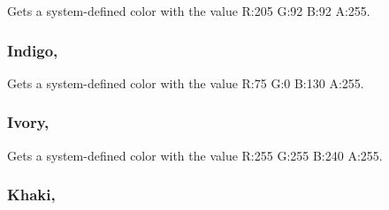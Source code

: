Gets a system-\/defined color with the value R\+:205 G\+:92 B\+:92 A\+:255.

\hypertarget{structMicrosoft_1_1Xna_1_1Framework_1_1Color_a3ffccddba75991c15ba0c0e062548f2b}{}
\subsubsection[{Indigo}]{ Indigo\hspace{0.3cm}{\ttfamily [static]}, {\ttfamily [get]}}\label{structMicrosoft_1_1Xna_1_1Framework_1_1Color_a3ffccddba75991c15ba0c0e062548f2b}


Gets a system-\/defined color with the value R\+:75 G\+:0 B\+:130 A\+:255.

\hypertarget{structMicrosoft_1_1Xna_1_1Framework_1_1Color_a022d2aa712eea8feb51479b13d63b171}{}
\subsubsection[{Ivory}]{ Ivory\hspace{0.3cm}{\ttfamily [static]}, {\ttfamily [get]}}\label{structMicrosoft_1_1Xna_1_1Framework_1_1Color_a022d2aa712eea8feb51479b13d63b171}


Gets a system-\/defined color with the value R\+:255 G\+:255 B\+:240 A\+:255.

\hypertarget{structMicrosoft_1_1Xna_1_1Framework_1_1Color_a2bf6d2259705f4c708f15c9665ce4475}{}
\subsubsection[{Khaki}]{ Khaki\hspace{0.3cm}{\ttfamily [static]}, {\ttfamily [get]}}\label{structMicrosoft_1_1Xna_1_1Framework_1_1Color_a2bf6d2259705f4c708f15c9665ce4475}


